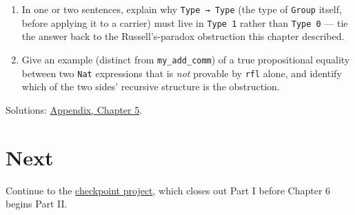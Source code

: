\begin{enumerate}
\item
  In one or two sentences, explain why \texttt{Type → Type} (the type of \texttt{Group} itself, before applying it to a carrier) must live in \texttt{Type 1} rather than \texttt{Type 0} --- tie the answer back to the Russell's-paradox obstruction this chapter described.
\item
  Give an example (distinct from \texttt{my\_\allowbreak{}add\_\allowbreak{}comm}) of a true propositional equality between two \texttt{Nat} expressions that is \emph{not} provable by \texttt{rfl} alone, and identify which of the two sides' recursive structure is the obstruction.
\end{enumerate}

Solutions: \hyperref[sec:14-appendix-solutions:04-chapter-5:1]{Appendix, Chapter 5}.

\section{Next}\label{sec:05-rigor-check:05-exercises:2}

Continue to the \hyperref[sec:05-rigor-check:06-checkpoint-project:1]{checkpoint project}, which closes out Part I before Chapter 6 begins Part II.
